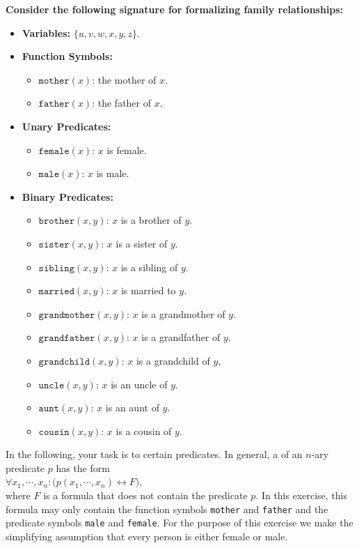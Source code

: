 \exerciseEng
\noindent \textbf{Consider the following signature for formalizing family relationships:}
\begin{itemize}
    \item \textbf{Variables:} $\{ u, v, w, x, y, z \}$.
    \item \textbf{Function Symbols:}
    \begin{itemize}
        \item $\texttt{mother}(x)$: the mother of $x$.
        \item $\texttt{father}(x)$: the father of $x$.
    \end{itemize}
    \item \textbf{Unary Predicates:}
    \begin{itemize}
        \item $\texttt{female}(x)$: $x$ is female.
        \item $\texttt{male}(x)$: $x$ is male.
    \end{itemize}
    \item \textbf{Binary Predicates:}
    \begin{itemize}
    \item $\texttt{brother}(x,y)$: $x$ is a brother of $y$.
    \item $\texttt{sister}(x,y)$: $x$ is a sister of $y$.
    \item $\texttt{sibling}(x,y)$: $x$ is a sibling of $y$.
    \item $\texttt{married}(x,y)$: $x$ is married to $y$.
    \item $\texttt{grandmother}(x,y)$: $x$ is a grandmother of $y$.
    \item $\texttt{grandfather}(x,y)$: $x$ is a grandfather of $y$.
    \item $\texttt{grandchild}(x, y)$: $x$ is a grandchild of $y$,
    \item $\texttt{uncle}(x,y)$: $x$ is an uncle of $y$.
    \item $\texttt{aunt}(x,y)$: $x$ is an aunt of $y$.
    \item $\texttt{cousin}(x,y)$: $x$ is a cousin of $y$.
    \end{itemize}
\end{itemize}
In the following, your task is to  certain predicates. In general, a  of an
$n$-ary predicate $p$ has the form 
\\[0.2cm]
\hspace*{1.3cm}
$\forall x_1, \cdots, x_n: \bigl(p(x_1,\cdots,x_n) \leftrightarrow F\bigr)$,
\\[0.2cm]
where $F$ is a formula that does not contain the predicate $p$.  In this exercise, this formula
may only contain the function symbols \texttt{mother} and \texttt{father} and the predicate symbols \texttt{male} and
\texttt{female}.  For the purpose of this exercise we make the simplifying assumption that
every person is either female or male.

